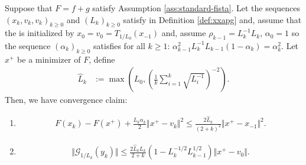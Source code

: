 \documentclass[12pt]{report}
\begin{document}
        \begin{theorem}\label{thm:xxapg-specialized-cnvg}
            Suppose that $F = f + g$ satisfy Assumption \ref{ass:standard-fista}. 
            Let the sequences $(x_k, v_k, v_k)_{k \ge 0}$ and $(L_k)_{k \ge 0}$ satisfy \XXAPG{} in Definition \ref{def:xxapg} and, assume that the \XXAPG{} is initialized by $x_0 = v_0 = T_{1/L_0}(x_{-1})$ and, assume $\rho_{k - 1} = L_{k}^{-1}L_{k}$, $\alpha_0 = 1$ so the sequence $(\alpha_k)_{k \ge 0}$ satisfies for all $k\ge 1$: $\alpha_{k - 1}^2L_k^{-1}L_{k - 1}(1 - \alpha_k) = \alpha_k^2$. 
            Let $x^+$ be a minimizer of $F$, define 
            \begin{align*}
                \widehat L_k &:= \max\left(
                    L_0, \left(
                        \frac{1}{k} \sum_{i = 1}^{k} \sqrt{L_i^{-1}}
                    \right)^{-2}
                \right). 
            \end{align*}
            Then, we have convergence claim: 
            \begin{enumerate}
                \item \begin{align*}
                    F(x_k) - F(x^+) + \frac{L_k\alpha_k}{2}\Vert x^+ - v_k\Vert^2 \le 
                    \frac{2\widehat L_k}{(2 + k)^2}\Vert x^+ - x_{-1}\Vert^2.
                \end{align*}
                \item 
                \begin{align*}
                    \Vert \mathcal G_{1/L_k}(y_k)\Vert \le 
                    \frac{2\widehat L_k L_k}{2 + k}
                    \left(
                        1 - L_k^{-1/2}L_{k - 1}^{1/2}
                    \right)
                    \Vert x^+ - v_0\Vert. 
                \end{align*}
            \end{enumerate}
        \end{theorem}
\end{document}
